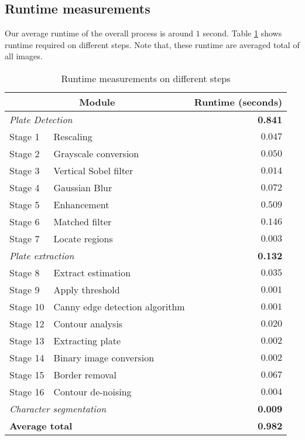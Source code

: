 
\subsection{Runtime measurements}
Our average runtime of the overall process is around $1$ second. Table \ref{table:Runtimes} shows runtime required on different steps. Note that, these runtime are averaged total of all images.


\begin{table}[!htb]
\centering
\begin{tabular}{|l|l|r|}
\hline
\multicolumn{2}{|c|}{\bf Module}  & {\bf Runtime (seconds)} \\
\hline
\multicolumn{2}{|l|}{\it Plate Detection} & {\bf 0.841} \\ 
\hline
Stage 1 & Rescaling & $0.047$ \\
Stage 2 & Grayscale conversion & $0.050$ \\
Stage 3 & Vertical Sobel filter & $0.014$ \\
Stage 4 & Gaussian Blur & $0.072$ \\
Stage 5 & Enhancement & $0.509$ \\
Stage 6 & Matched filter & $0.146$ \\
Stage 7 & Locate regions & $0.003$ \\
\hline
\multicolumn{2}{|l|}{\it Plate extraction} & {\bf 0.132} \\ 
\hline
Stage 8 & Extract estimation & $0.035$ \\ 
Stage 9 & Apply threshold & $0.001$ \\ 
Stage 10 & Canny edge detection algorithm & $0.001$  \\ 
Stage 12 & Contour analysis & $0.020$ \\ 
Stage 13 & Extracting plate & $0.002$ \\ 
Stage 14 & Binary image conversion & $0.002$ \\ 
Stage 15 & Border removal & $0.067$ \\ 
Stage 16 & Contour de-noising & $0.004$ \\
\hline
\multicolumn{2}{|l|}{\it Character segmentation} & {\bf 0.009} \\ 
\hline
\multicolumn{2}{|l|}{\bf Average total} & {\bf 0.982} \\ 
\hline
\end{tabular}
\caption{Runtime measurements on different steps}
\label{table:Runtimes}
\end{table} 



